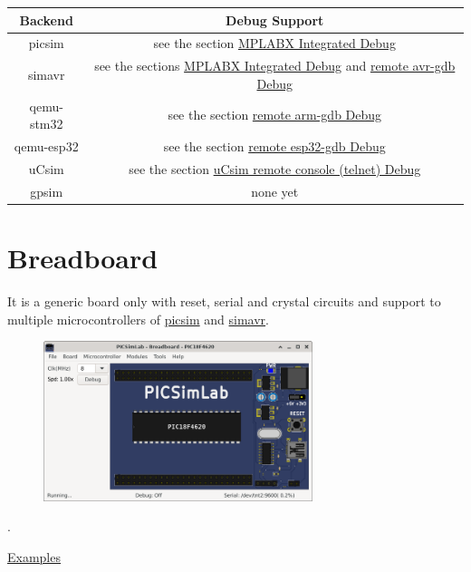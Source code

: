 \begin{center}
\begin{tabular}{c|c}
\hline \textbf{Backend} & \textbf{Debug Support}\\
\hline picsim & see the section \hyperlink{def:mplabxd}{MPLABX Integrated Debug}\\
\hline simavr & see the sections \hyperlink{def:mplabxd}{MPLABX Integrated Debug} and \hyperlink{def:gdbavr}{remote avr-gdb Debug}\\
\hline qemu-stm32 & see the section \hyperlink{def:gdbarm}{remote arm-gdb Debug}\\
\hline qemu-esp32 & see the section \hyperlink{def:gdbesp}{remote esp32-gdb Debug}\\
\hline uCsim & see the section \hyperlink{def:ucsim}{uCsim remote console (telnet) Debug}\\
\hline gpsim & none yet\\
\hline 
\end{tabular}
\end{center}



\section{Breadboard}

It is a generic board only with reset, serial and crystal circuits and support to multiple microcontrollers 
of \href{https://github.com/lcgamboa/picsim}{picsim} and \href{https://github.com/buserror/simavr}{simavr}.

\begin{figure}[H]
\center
\includegraphics[width=0.7\textwidth]{img/picsimlab0.png} 
\end{figure} 

.\vspace{0.5cm}

\href{https://lcgamboa.github.io/picsimlab_examples/board_Breadboard.html}{Examples}

